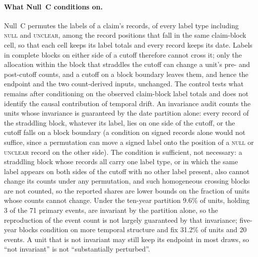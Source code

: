 \documentclass[11pt]{article}
\begin{document}
\paragraph{What Null~C conditions on.} Null~C permutes the labels of a claim's records, of every
label type including \textsc{null} and \textsc{unclear}, among the record positions that fall in
the same claim-block cell, so that each cell keeps its label totals and every record keeps its
date. Labels in complete blocks on either side of a cutoff therefore cannot cross it; only the
allocation within the block that straddles the cutoff can change a unit's pre- and post-cutoff
counts, and a cutoff on a block boundary leaves them, and hence the endpoint and the two
count-derived inputs, unchanged. The control tests what remains after conditioning on the observed
claim-block label totals and does not identify the causal contribution of temporal drift. An
invariance audit counts the units whose invariance is guaranteed by the date partition alone:
every record of the straddling block, whatever its label, lies on one side of the cutoff, or the
cutoff falls on a block boundary (a condition on signed records alone would not suffice, since a
permutation can move a signed label onto the position of a \textsc{null} or \textsc{unclear}
record on the other side). The condition is sufficient, not necessary: a straddling block whose
records all carry one label type, or in which the same label appears on both sides of the cutoff
with no other label present, also cannot change its counts under any permutation, and such
homogeneous crossing blocks are not counted, so the reported shares are lower bounds on the
fraction of units whose counts cannot change. Under the ten-year partition 9.6\% of units,
holding 3 of the 71 primary events, are invariant by the partition alone, so the reproduction of
the event count is not largely guaranteed by that invariance; five-year blocks condition on more
temporal structure and fix 31.2\% of units and 20 events. A unit that is not invariant may still keep its
endpoint in most draws, so ``not invariant'' is not ``substantially perturbed''.
\end{document}
